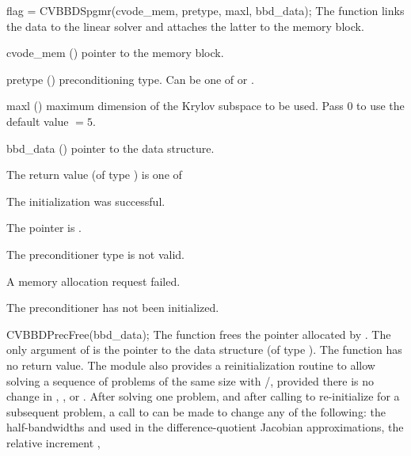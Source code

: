 {
  flag = CVBBDSpgmr(cvode\_mem, pretype, maxl, bbd\_data);
}
{
  The function  links the {\cvbbdpre} data to the
  {\cvspgmr} linear solver and attaches the latter to the {\cvodes}
  memory block.
}
{
  \begin{args}
  \item[cvode\_mem] ()
    pointer to the {\cvodes} memory block.
  \item[pretype] ()
    preconditioning type. Can be one of  or .
  \item[maxl] ()
    maximum dimension of the Krylov subspace to be used. Pass $0$ to use the 
    default value $=5$.
  \item[bbd\_data] ()
    pointer to the {\cvbbdpre} data structure.
  \end{args}
}
{
  The return value  (of type ) is one of
  \begin{args}
  \item[\Id{SUCCESS}] 
    The {\cvspgmr} initialization was successful.
  \item[\Id{LIN\_NO\_MEM}]
    The  pointer is .
  \item[\Id{LIN\_ILL\_INPUT}]
    The preconditioner type  is not valid.
  \item[\Id{LMEM\_FAIL}]
    A memory allocation request failed.
  \item[\Id{BBDP\_NO\_DATA}]
    The {\cvbbdpre} preconditioner has not been initialized.
  \end{args}
}
{}
{
  CVBBDPrecFree(bbd\_data);
}
{
  The function  frees the pointer allocated by
  .
}
{
  The only argument of  is the pointer to the {\cvbbdpre} 
  data structure (of type ).
}
{
  The function  has no return value.
}
{}
The {\cvbbdpre} module also provides a reinitialization routine to allow
solving  a sequence of problems of the same size with {\cvspgmr}/{\cvbbdpre},
provided there is no change in , , or .
After solving one problem, and after calling  to re-initialize 
{\cvodes} for a subsequent problem, a call to  can be made
to change any of the following: the half-bandwidths  and  
used in the difference-quotient Jacobian approximations, the relative increment , 
